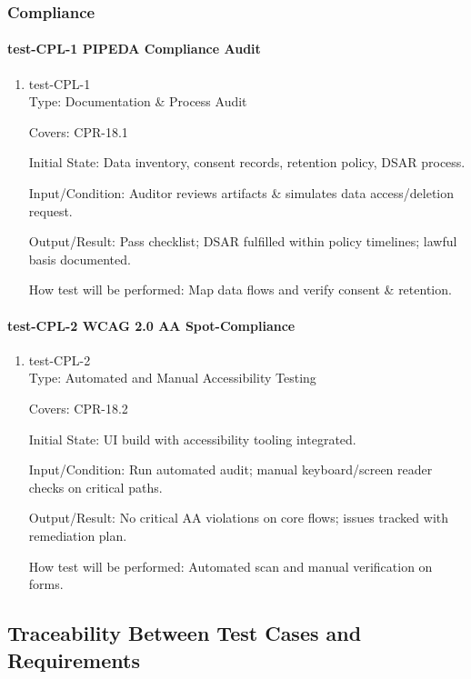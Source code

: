 \documentclass[12pt, titlepage]{article}
\begin{document}
\subsubsection{Compliance}

\paragraph{test-CPL-1 PIPEDA Compliance Audit}

\begin{enumerate}
\item{test-CPL-1\\}
Type: Documentation \& Process Audit

Covers: CPR-18.1

Initial State: Data inventory, consent records, retention policy, DSAR process.

Input/Condition: Auditor reviews artifacts \& simulates data access/deletion request.

Output/Result: Pass checklist; DSAR fulfilled within policy timelines; lawful basis documented.

How test will be performed: Map data flows and verify consent \& retention.
\end{enumerate}

\paragraph{test-CPL-2 WCAG 2.0 AA Spot-Compliance}

\begin{enumerate}
\item{test-CPL-2\\}
Type: Automated and Manual Accessibility Testing

Covers: CPR-18.2

Initial State: UI build with  accessibility tooling integrated.

Input/Condition: Run automated audit; manual keyboard/screen reader checks on critical paths.

Output/Result: No critical AA violations on core flows; issues tracked with remediation plan.

How test will be performed: Automated scan and manual verification on forms.
\end{enumerate}

\subsection{Traceability Between Test Cases and Requirements}
\end{document}
